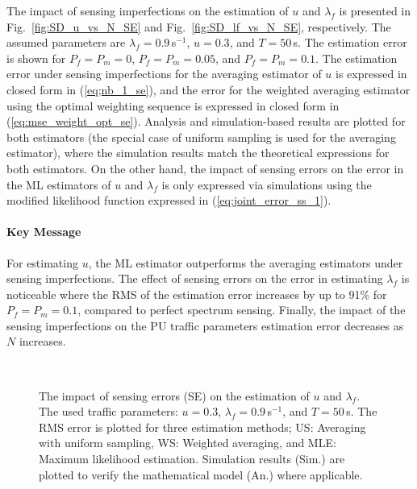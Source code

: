 \documentclass[11pt,draftclsnofoot,journal,onecolumn]{IEEEtran}
\begin{document}
The impact of sensing imperfections on the estimation of $u$ and $\lambda_f$ is presented in Fig.~\ref{fig:SD_u_vs_N_SE} and Fig.~\ref{fig:SD_lf_vs_N_SE}, respectively. The assumed parameters are $\lambda_f = 0.9$\,s$^{-1}$, $u=0.3$, and $T=50$\,s. The estimation error is shown for $P_f=P_m=0$, $P_f=P_m=0.05$, and $P_f=P_m=0.1$. The estimation error under sensing imperfections for the averaging estimator of $u$ is expressed in closed form in (\ref{eq;nb_1_se}), and the error for the weighted averaging estimator using the optimal weighting sequence is expressed in closed form in (\ref{eq:mse_weight_opt_se}). Analysis and simulation-based results are plotted for both estimators (the special case of uniform sampling is used for the averaging estimator), where the simulation results match the theoretical expressions for both estimators. On the other hand, the impact of sensing errors on the error in the ML estimators of $u$ and $\lambda_f$ is only expressed via simulations using the modified likelihood function expressed in (\ref{eq;joint_error_ss_1}).

\paragraph*{Key Message}

For estimating $u$, the ML estimator outperforms the averaging estimators under sensing imperfections. The effect of sensing errors on the error in estimating $\lambda_f$ is noticeable where the RMS of the estimation error increases by up to 91\% for $P_f=P_m=0.1$, compared to perfect spectrum sensing. Finally, the impact of the sensing imperfections on the PU traffic parameters estimation error decreases as $N$ increases.

\begin{figure}
\centering
{}\\
\caption{The impact of sensing errors (SE) on the estimation of $u$ and $\lambda_f$. The used traffic parameters: $u = 0.3$, $\lambda_f = 0.9$\,s$^{-1}$, and $T=50$\,s. The RMS error is plotted for three estimation methods; US: Averaging with uniform sampling, WS: Weighted averaging, and MLE: Maximum likelihood estimation. Simulation results (Sim.) are plotted to verify the mathematical model (An.) where applicable.}
\end{figure}
\end{document}
